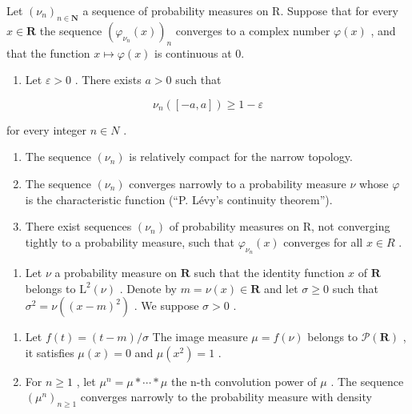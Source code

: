 Let \((\nu_{n})_{n\in\mathbf{N}}\) a sequence of probability measures on R. Suppose that for every \(x\in\mathbf{R}\) the sequence \((\varphi_{\nu_{n}}(x))_{n}\) converges to a complex number \(\varphi(x)\) , and that the function \(x\mapsto\varphi(x)\) is continuous at 0.

\begin{enumerate}
\def\labelenumi{\alph{enumi})}
\setcounter{enumi}{5}
\tightlist
\item
  Let \(\varepsilon > 0\) . There exists \(a > 0\) such that
\end{enumerate}

\[
\nu_ {n} ([ - a, a ]) \geqslant 1 - \varepsilon
\]

for every integer \(n \in N\) .

\begin{enumerate}
\def\labelenumi{\alph{enumi})}
\setcounter{enumi}{6}
\item
  The sequence \((\nu_{n})\) is relatively compact for the narrow topology.
\item
  The sequence \((\nu_{n})\) converges narrowly to a probability measure \(\nu\) whose \(\varphi\) is the characteristic function (“P. Lévy’s continuity theorem”).
\item
  There exist sequences \((\nu_{n})\) of probability measures on R, not converging tightly to a probability measure, such that \(\varphi_{\nu_{n}}(x)\) converges for all \(x \in R\) .
\end{enumerate}

\begin{enumerate}
\def\labelenumi{\arabic{enumi})}
\setcounter{enumi}{39}
\tightlist
\item
  Let \(\nu\) a probability measure on \(\mathbf{R}\) such that the identity function \(x\) of \(\mathbf{R}\) belongs to \(\mathrm{L}^2 (\nu)\) . Denote by \(m = \nu (x)\in \mathbf{R}\) and let \(\sigma \geqslant 0\) such that \(\sigma^2 = \nu ((x - m)^2)\) . We suppose \(\sigma >0\) .
\end{enumerate}

\begin{enumerate}
\def\labelenumi{\alph{enumi})}
\item
  Let \(f(t) = (t - m) / \sigma\) The image measure \(\mu = f(\nu)\) belongs to \(\mathcal{P}(\mathbf{R})\) , it satisfies \(\mu(x) = 0\) and \(\mu(x^2) = 1\) .
\item
  For \(n \geqslant 1\) , let \(\mu^{n} = \mu * \cdots * \mu\) the n-th convolution power of \(\mu\) . The sequence \((\mu^{n})_{n \geqslant 1}\) converges narrowly to the probability measure with density
\end{enumerate}

